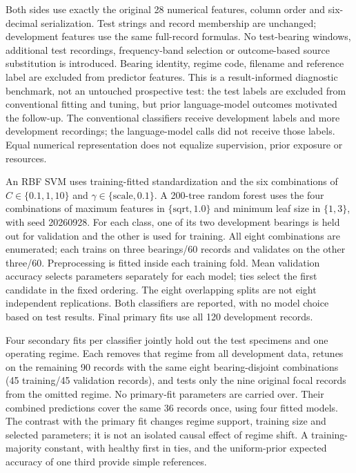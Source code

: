 \documentclass[11pt,a4paper]{article}
\begin{document}
Both sides use exactly the original 28 numerical features, column order and six-decimal serialization. Test strings and record membership are unchanged; development features use the same full-record formulas. No test-bearing windows, additional test recordings, frequency-band selection or outcome-based source substitution is introduced. Bearing identity, regime code, filename and reference label are excluded from predictor features. This is a result-informed diagnostic benchmark, not an untouched prospective test: the test labels are excluded from conventional fitting and tuning, but prior language-model outcomes motivated the follow-up. The conventional classifiers receive development labels and more development recordings; the language-model calls did not receive those labels. Equal numerical representation does not equalize supervision, prior exposure or resources.

An RBF SVM uses training-fitted standardization and the six combinations of $C\in\{0.1,1,10\}$ and $\gamma\in\{\mathrm{scale},0.1\}$. A 200-tree random forest uses the four combinations of maximum features in $\{\mathrm{sqrt},1.0\}$ and minimum leaf size in $\{1,3\}$, with seed 20260928. For each class, one of its two development bearings is held out for validation and the other is used for training. All eight combinations are enumerated; each trains on three bearings/60 records and validates on the other three/60. Preprocessing is fitted inside each training fold. Mean validation accuracy selects parameters separately for each model; ties select the first candidate in the fixed ordering. The eight overlapping splits are not eight independent replications. Both classifiers are reported, with no model choice based on test results. Final primary fits use all 120 development records.

Four secondary fits per classifier jointly hold out the test specimens and one operating regime. Each removes that regime from all development data, retunes on the remaining 90 records with the same eight bearing-disjoint combinations (45 training/45 validation records), and tests only the nine original focal records from the omitted regime. No primary-fit parameters are carried over. Their combined predictions cover the same 36 records once, using four fitted models. The contrast with the primary fit changes regime support, training size and selected parameters; it is not an isolated causal effect of regime shift. A training-majority constant, with healthy first in ties, and the uniform-prior expected accuracy of one third provide simple references.
\end{document}
